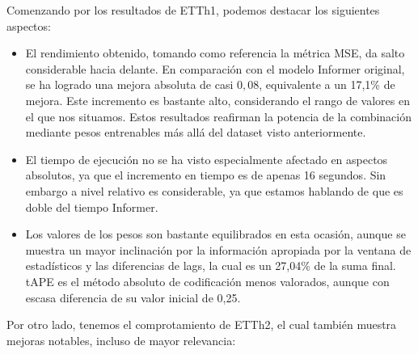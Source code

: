 Comenzando por los resultados de ETTh1, podemos destacar los siguientes aspectos:

\begin{itemize}
	\item El rendimiento obtenido, tomando como referencia la métrica MSE, da salto considerable hacia delante. En comparación con el modelo Informer original, se ha logrado una mejora absoluta de casi $0,08$, equivalente a un 17,1\% de mejora. Este incremento es bastante alto, considerando el rango de valores en el que nos situamos. Estos resultados reafirman la potencia de la combinación mediante pesos entrenables más allá del dataset visto anteriormente.
	\item El tiempo de ejecución no se ha visto especialmente afectado en aspectos absolutos, ya que el incremento en tiempo es de apenas 16 segundos. Sin embargo a nivel relativo es considerable, ya que estamos hablando de que es doble del tiempo Informer.
	\item Los valores de los pesos son bastante equilibrados en esta ocasión, aunque se muestra un mayor inclinación por la información apropiada por la ventana de estadísticos y las diferencias de lags, la cual es un 27,04\% de la suma final. tAPE es el método absoluto de codificación menos valorados, aunque con escasa diferencia de su valor inicial de 0,25.
\end{itemize}


Por otro lado, tenemos el comprotamiento de ETTh2, el cual también muestra mejoras notables, incluso de mayor relevancia:


